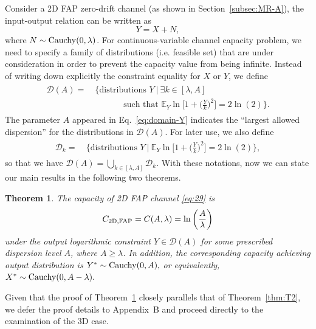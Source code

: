 \documentclass[conference]{IEEEtran}
\newcommand{\E}{\mathbb{E}}
\theoremstyle{definition}
\theoremstyle{plain}
\newtheorem{thm}{Theorem}
\begin{document}
Consider a 2D FAP zero-drift channel (as shown in Section~\ref{subsec:MR-A}), the input-output relation can be written as
\begin{equation}
    Y=X+N,
\label{eq:29}
\end{equation}
where $N\sim {\rm Cauchy}(0,\lambda)$.
For continuous-variable channel capacity problem, we need to specify a family of distributions (i.e. feasible set) that are under consideration in order to prevent the capacity value from being infinite. Instead of writing down explicitly the constraint equality for $X$ or $Y$, we define
\begin{align}
\begin{split}
\mathcal{D}(A)
=\ 
&\Big\{\text{distributions\ }Y\ \Big|\ \exists k\in[\lambda,A]\\ 
&\quad\quad\quad\text{\ such that\ }
\E_Y \ln \Big[1+\Big(\frac{Y}{k}\Big)^2\Big] = 2\ln(2)
\Big\}.
\end{split}
\label{eq:domain-Y}
\end{align}
The parameter $A$ appeared in Eq.~\eqref{eq:domain-Y} indicates the ``largest allowed dispersion'' for the distributions in $\mathcal{D}(A)$. 
For later use, we also define
\begin{align}
\begin{split}
\mathcal{D}_k
=\ 
&\Big\{\text{distributions\ }Y\ \Big|\
\E_Y \ln \Big[1+\Big(\frac{Y}{k}\Big)^2\Big] = 2\ln(2)
\Big\},
\end{split}
\label{eq:domain-k}
\end{align}
so that we have
$
    \mathcal{D}(A)=\bigcup_{k\in[\lambda,A]} \mathcal{D}_k.
$
With these notations, now we can state our main results in the following two theorems.
\begin{thm}
The capacity of 2D FAP channel \eqref{eq:29} is
\begin{equation}
    C_{\rm{2D,FAP}}=C(A,\lambda)=\ln\left(\dfrac{A}{\lambda}\right)
\end{equation}
under the output logarithmic constraint
$
Y\in \mathcal{D}(A)
$
for some 
prescribed dispersion level $A$, where $A \geq \lambda$.
In addition, the corresponding capacity achieving output distribution is
$
Y^* \sim {\rm Cauchy}(0,A),  
$
or equivalently,
$
X^* \sim {\rm Cauchy}(0,A-\lambda).
$
\label{thm:T1}
\end{thm}

\color{black}
Given that the proof of Theorem~\ref{thm:T1} closely parallels that of Theorem~\ref{thm:T2}, we defer the proof details to Appendix~B and proceed directly to the examination of the 3D case.
\color{black}
\end{document}
